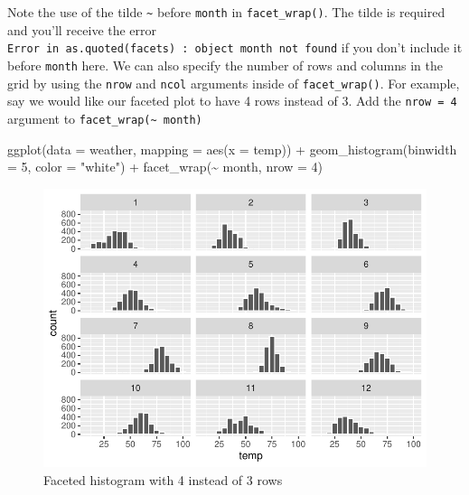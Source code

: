 \documentclass[
  letterpaper,
  DIV=11,
  numbers=noendperiod]{scrreprt}
\newenvironment{Shaded}{\begin{snugshade}}{\end{snugshade}}
\newcommand{\AttributeTok}[1]{\textcolor[rgb]{0.40,0.45,0.13}{#1}}
\newcommand{\DecValTok}[1]{\textcolor[rgb]{0.68,0.00,0.00}{#1}}
\newcommand{\FunctionTok}[1]{\textcolor[rgb]{0.28,0.35,0.67}{#1}}
\newcommand{\NormalTok}[1]{\textcolor[rgb]{0.00,0.23,0.31}{#1}}
\newcommand{\SpecialCharTok}[1]{\textcolor[rgb]{0.37,0.37,0.37}{#1}}
\newcommand{\StringTok}[1]{\textcolor[rgb]{0.13,0.47,0.30}{#1}}
\theoremstyle{definition}
\theoremstyle{remark}
\begin{document}
Note the use of the tilde \texttt{\textasciitilde{}} before
\texttt{month} in \texttt{facet\_wrap()}. The tilde is required and
you'll receive the error
\texttt{Error\ in\ as.quoted(facets)\ :\ object\ \textquotesingle{}month\textquotesingle{}\ not\ found}
if you don't include it before \texttt{month} here. We can also specify
the number of rows and columns in the grid by using the \texttt{nrow}
and \texttt{ncol} arguments inside of \texttt{facet\_wrap()}. For
example, say we would like our faceted plot to have 4 rows instead of 3.
Add the \texttt{nrow\ =\ 4} argument to
\texttt{facet\_wrap(\textasciitilde{}\ month)}

\begin{Shaded}
\begin{Highlighting}[]
\FunctionTok{ggplot}\NormalTok{(}\AttributeTok{data =}\NormalTok{ weather, }\AttributeTok{mapping =} \FunctionTok{aes}\NormalTok{(}\AttributeTok{x =}\NormalTok{ temp)) }\SpecialCharTok{+}
  \FunctionTok{geom\_histogram}\NormalTok{(}\AttributeTok{binwidth =} \DecValTok{5}\NormalTok{, }\AttributeTok{color =} \StringTok{"white"}\NormalTok{) }\SpecialCharTok{+}
  \FunctionTok{facet\_wrap}\NormalTok{(}\SpecialCharTok{\textasciitilde{}}\NormalTok{ month, }\AttributeTok{nrow =} \DecValTok{4}\NormalTok{)}
\end{Highlighting}
\end{Shaded}

\begin{figure}[H]

{\centering \includegraphics{02-visualization_files/figure-pdf/fig-facethistogram2-1.pdf}

}

\caption{\label{fig-facethistogram2}Faceted histogram with 4 instead of
3 rows}

\end{figure}
\end{document}
